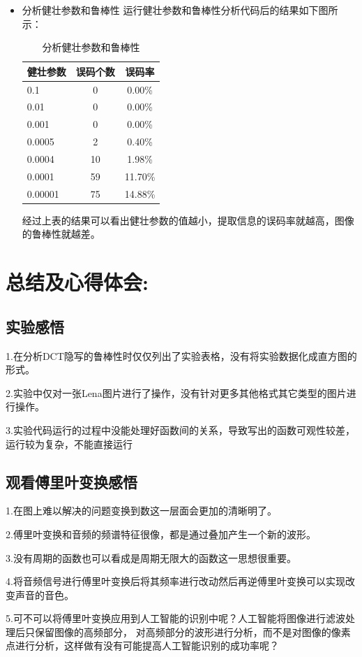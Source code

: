 \documentclass[a4paper,11pt,UTF8]{ctexart}
\begin{document}
\begin{itemize}
    \item 分析健壮参数和鲁棒性
        运行健壮参数和鲁棒性分析代码后的结果如下图所示：
        \begin{table}[!h!tbp]
          \caption{分析健壮参数和鲁棒性}\label{tab3}
            \centering
          \begin{tabular*}{0.75\textwidth}{@{\extracolsep{\fill}}lcc}
              \toprule
              健壮参数          &误码个数       &误码率                \\
              \midrule
              0.1                 &0           &0.00\%               \\
              0.01                &0           &0.00\%           \\
              0.001               &0           &0.00\%            \\
              0.0005              &2           &0.40\%          \\
              0.0004              &10          &1.98\%            \\
              0.0001              &59          &11.70\%          \\
              0.00001             &75          &14.88\%         \\
              \bottomrule			
          \end{tabular*}
        \end{table}\par
        经过上表的结果可以看出健壮参数的值越小，提取信息的误码率就越高，图像的鲁棒性就越差。
  \end{itemize}

\section{总结及心得体会:}
    \subsection{实验感悟}
    1.在分析DCT隐写的鲁棒性时仅仅列出了实验表格，没有将实验数据化成直方图的形式。\par
    2.实验中仅对一张Lena图片进行了操作，没有针对更多其他格式其它类型的图片进行操作。\par
    3.实验代码运行的过程中没能处理好函数间的关系，导致写出的函数可观性较差，运行较为复杂，不能直接运行\par
    \subsection{观看傅里叶变换感悟}
    1.在图上难以解决的问题变换到数这一层面会更加的清晰明了。\par
    2.傅里叶变换和音频的频谱特征很像，都是通过叠加产生一个新的波形。\par
    3.没有周期的函数也可以看成是周期无限大的函数这一思想很重要。\par
    4.将音频信号进行傅里叶变换后将其频率进行改动然后再逆傅里叶变换可以实现改变声音的音色。\par
    5.可不可以将傅里叶变换应用到人工智能的识别中呢？人工智能将图像进行滤波处理后只保留图像的高频部分，
    对高频部分的波形进行分析，而不是对图像的像素点进行分析，这样做有没有可能提高人工智能识别的成功率呢？
\end{document}
